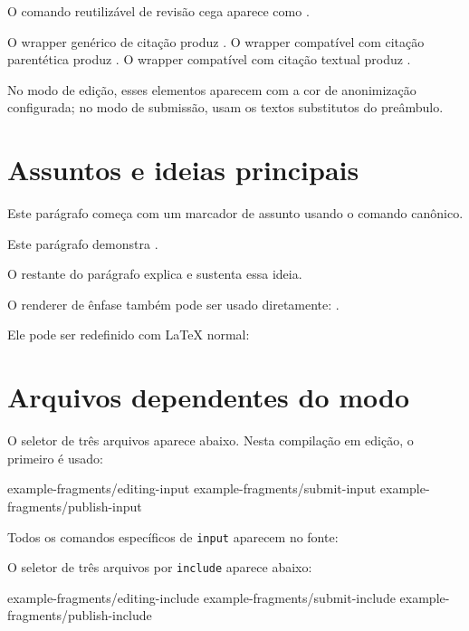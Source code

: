 \documentclass[11pt]{article}
\begin{document}
O comando reutilizável de revisão cega aparece como \nomedoprojeto.

O wrapper genérico de citação produz .
O wrapper compatível com citação parentética produz
.
O wrapper compatível com citação textual produz .

No modo de edição, esses elementos aparecem com a cor de anonimização
configurada; no modo de submissão, usam os textos substitutos do preâmbulo.

\section{Assuntos e ideias principais}

Este parágrafo começa com um marcador de assunto usando o comando canônico.

Este parágrafo demonstra \texttt{\string\cwassunto}.

O restante do parágrafo explica e sustenta essa ideia.

O renderer de ênfase também pode ser usado diretamente:
.

Ele pode ser redefinido com LaTeX normal:
\renewcommand{\cwmainemphasis}[1]{\textbf{#1}}

\section{Arquivos dependentes do modo}

O seletor de três arquivos aparece abaixo. Nesta compilação em edição,
o primeiro é usado:

\cwinput
  {example-fragments/editing-input}
  {example-fragments/submit-input}
  {example-fragments/publish-input}

Todos os comandos específicos de \texttt{input} aparecem no fonte:


O seletor de três arquivos por \texttt{include} aparece abaixo:

\cwinclude
  {example-fragments/editing-include}
  {example-fragments/submit-include}
  {example-fragments/publish-include}
\end{document}
